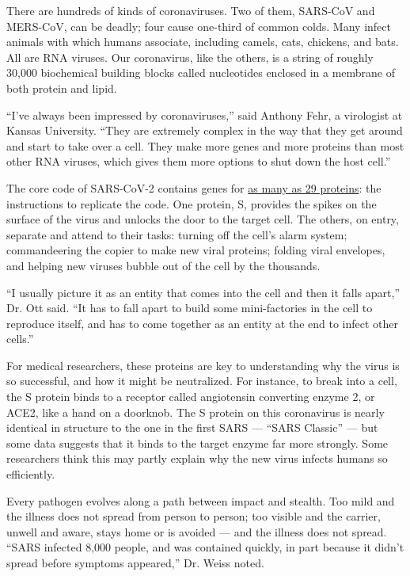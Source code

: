 There are hundreds of kinds of coronaviruses. Two of them, SARS-CoV and
MERS-CoV, can be deadly; four cause one-third of common colds. Many
infect animals with which humans associate, including camels, cats,
chickens, and bats. All are RNA viruses. Our coronavirus, like the
others, is a string of roughly 30,000 biochemical building blocks called
nucleotides enclosed in a membrane of both protein and lipid.

``I've always been impressed by coronaviruses,'' said Anthony Fehr, a
virologist at Kansas University. ``They are extremely complex in the way
that they get around and start to take over a cell. They make more genes
and more proteins than most other RNA viruses, which gives them more
options to shut down the host cell.''

The core code of SARS-CoV-2 contains genes for
\href{https://www.nytimes3xbfgragh.onion/interactive/2020/04/03/science/coronavirus-genome-bad-news-wrapped-in-protein.html?searchResultPosition=1}{as
many as 29 proteins}: the instructions to replicate the code. One
protein, S, provides the spikes on the surface of the virus and unlocks
the door to the target cell. The others, on entry, separate and attend
to their tasks: turning off the cell's alarm system; commandeering the
copier to make new viral proteins; folding viral envelopes, and helping
new viruses bubble out of the cell by the thousands.

``I usually picture it as an entity that comes into the cell and then it
falls apart,'' Dr. Ott said. ``It has to fall apart to build some
mini-factories in the cell to reproduce itself, and has to come together
as an entity at the end to infect other cells.''

For medical researchers, these proteins are key to understanding why the
virus is so successful, and how it might be neutralized. For instance,
to break into a cell, the S protein binds to a receptor called
angiotensin converting enzyme 2, or ACE2, like a hand on a doorknob. The
S protein on this coronavirus is nearly identical in structure to the
one in the first SARS --- ``SARS Classic'' --- but some data suggests
that it binds to the target enzyme far more strongly. Some researchers
think this may partly explain why the new virus infects humans so
efficiently.

Every pathogen evolves along a path between impact and stealth. Too mild
and the illness does not spread from person to person; too visible and
the carrier, unwell and aware, stays home or is avoided --- and the
illness does not spread. ``SARS infected 8,000 people, and was contained
quickly, in part because it didn't spread before symptoms appeared,''
Dr. Weiss noted.

